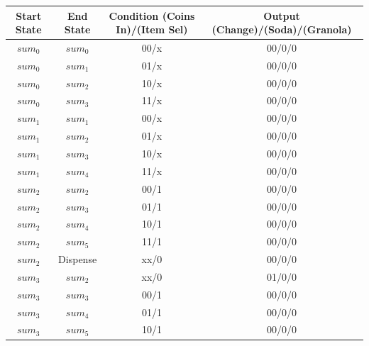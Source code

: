 \documentclass[12pt]{article}
\begin{document}
\begin{center}
  \begin{tabular}{c c c c}
    \toprule
    Start State & End State & Condition (Coins In)/(Item Sel) & Output (Change)/(Soda)/(Granola) \\
    \midrule
    $sum_0$     & $sum_0$   & 00/x                            & 00/0/0                           \\
    $sum_0$     & $sum_1$   & 01/x                            & 00/0/0                           \\
    $sum_0$     & $sum_2$   & 10/x                            & 00/0/0                           \\
    $sum_0$     & $sum_3$   & 11/x                            & 00/0/0                           \\
    $sum_1$     & $sum_1$   & 00/x                            & 00/0/0                           \\
    $sum_1$     & $sum_2$   & 01/x                            & 00/0/0                           \\
    $sum_1$     & $sum_3$   & 10/x                            & 00/0/0                           \\
    $sum_1$     & $sum_4$   & 11/x                            & 00/0/0                           \\
    $sum_2$     & $sum_2$   & 00/1                            & 00/0/0                           \\
    $sum_2$     & $sum_3$   & 01/1                            & 00/0/0                           \\
    $sum_2$     & $sum_4$   & 10/1                            & 00/0/0                           \\
    $sum_2$     & $sum_5$   & 11/1                            & 00/0/0                           \\
    $sum_2$     & Dispense  & xx/0                            & 00/0/0                           \\
    $sum_3$     & $sum_2$   & xx/0                            & 01/0/0                           \\
    $sum_3$     & $sum_3$   & 00/1                            & 00/0/0                           \\
    $sum_3$     & $sum_4$   & 01/1                            & 00/0/0                           \\
    $sum_3$     & $sum_5$   & 10/1                            & 00/0/0                           \\

\end{tabular}
\end{center}
\end{document}
